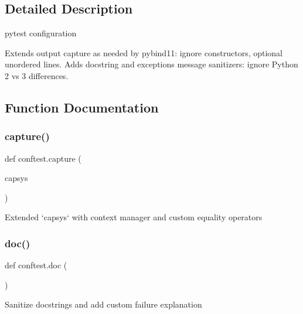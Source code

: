 \subsection{Detailed Description}
\begin{DoxyVerb}pytest configuration

Extends output capture as needed by pybind11: ignore constructors, optional unordered lines.
Adds docstring and exceptions message sanitizers: ignore Python 2 vs 3 differences.
\end{DoxyVerb}
 

\subsection{Function Documentation}
\mbox{\label{namespaceconftest_aad7bbb453045d1770805438a473317a4}} 
\subsubsection{\texorpdfstring{capture()}{capture()}}
{\footnotesize\ttfamily def conftest.\+capture (\begin{DoxyParamCaption}\item[{}]{capsys }\end{DoxyParamCaption})}

\begin{DoxyVerb}Extended `capsys` with context manager and custom equality operators\end{DoxyVerb}
 \mbox{\label{namespaceconftest_a35de28597d48d0a25c748a140765032e}} 
\subsubsection{\texorpdfstring{doc()}{doc()}}
{\footnotesize\ttfamily def conftest.\+doc (\begin{DoxyParamCaption}{ }\end{DoxyParamCaption})}

\begin{DoxyVerb}Sanitize docstrings and add custom failure explanation\end{DoxyVerb}
 \mbox{\label{namespaceconftest_ae5bb8caa851371d0b8576827a6a20f0f}} 
